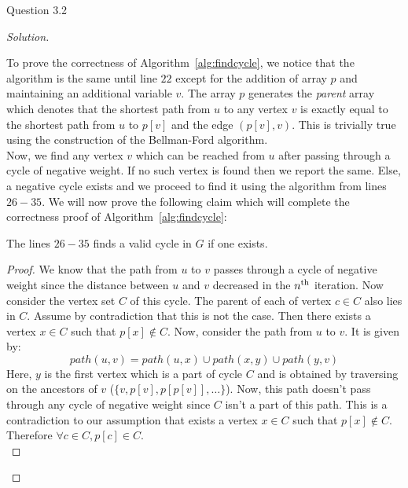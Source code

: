\begin{solution}{Question 3.2}
\begin{proof}[Solution]
\begin{algorithm}[H]
\begin{algorithmic}[1]
                    \EndWhile{}
                \EndProcedure{}
            \end{algorithmic}
        \end{algorithm}
        To prove the correctness of Algorithm~\ref{alg:findcycle}, we notice that the algorithm is the same until line $22$ except for the addition of array $p$ and maintaining an additional variable $v$. The array $p$ generates the \textit{parent} array which denotes that the shortest path from $u$ to any vertex $v$ is exactly equal to the shortest path from $u$ to $p[v]$ and the edge $(p[v], v)$. This is trivially true using the construction of the Bellman-Ford algorithm.\\
        Now, we find any vertex $v$ which can be reached from $u$ after passing through a cycle of negative weight. If no such vertex is found then we report the same. Else, a negative cycle exists and we proceed to find it using the algorithm from lines $26-35$. We will now prove the following claim which will complete the correctness proof of Algorithm~\ref{alg:findcycle}:
        \begin{claim}\label{claim:findcycle}
            The lines $26-35$ finds a valid cycle in $G$ if one exists.
        \end{claim}
        \begin{proof}
            We know that the path from $u$ to $v$ passes through a cycle of negative weight since the distance between $u$ and $v$ decreased in the $n\textsuperscript{th}$ iteration. Now consider the vertex set $C$ of this cycle. The parent of each of vertex $c\in C$ also lies in $C$. Assume by contradiction that this is not the case. Then there exists a vertex $x\in C$ such that $p[x]\notin C$. Now, consider the path from $u$ to $v$. It is given by:
            \begin{equation}
                path(u, v) = path(u, x)\cup path(x, y)\cup path(y, v)
            \end{equation}
            Here, $y$ is the first vertex which is a part of cycle $C$ and is obtained by traversing on the ancestors of $v$ ($\{v, p[v], p[p[v]], \ldots\}$). Now, this path doesn't pass through any cycle of negative weight since $C$ isn't a part of this path. This is a contradiction to our assumption that exists a vertex $x\in C$ such that $p[x]\notin C$. Therefore $\forall c\in C, p[c]\in C$.\\

\end{proof}
\end{proof}
\end{solution}
